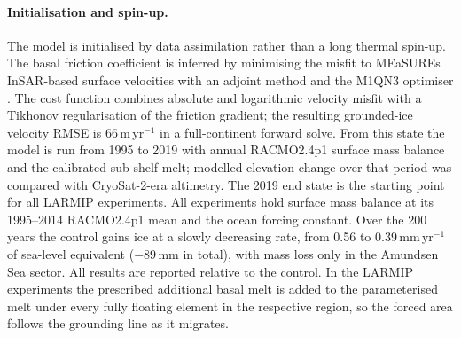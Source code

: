 \paragraph{Initialisation and spin-up.}
The model is initialised by data assimilation rather than a long thermal spin-up. The basal
friction coefficient is inferred by minimising the misfit to MEaSUREs InSAR-based surface
velocities \citep{rignot2011,mouginot2019} with an adjoint method \citep{morlighem2010} and the
M1QN3 optimiser \citep{gilbert1989}. The cost function combines absolute and logarithmic velocity
misfit with a Tikhonov regularisation of the friction gradient; the resulting grounded-ice velocity
RMSE is 66\,m\,yr$^{-1}$ in a full-continent forward solve. From this state the model is run from
1995 to 2019 with annual RACMO2.4p1 surface mass balance and the calibrated sub-shelf melt;
modelled elevation change over that period was compared with CryoSat-2-era altimetry. The 2019 end
state is the starting point for all LARMIP experiments. All experiments hold surface mass balance
at its 1995--2014 RACMO2.4p1 mean and the ocean forcing constant. Over the 200 years the control
gains ice at a slowly decreasing rate, from 0.56 to 0.39\,mm\,yr$^{-1}$ of sea-level equivalent
($-89$\,mm in total), with mass loss only in the Amundsen Sea sector. All results are reported relative to the control.
In the LARMIP experiments the prescribed additional basal melt is added to the parameterised melt
under every fully floating element in the respective region, so the forced area follows the
grounding line as it migrates.
